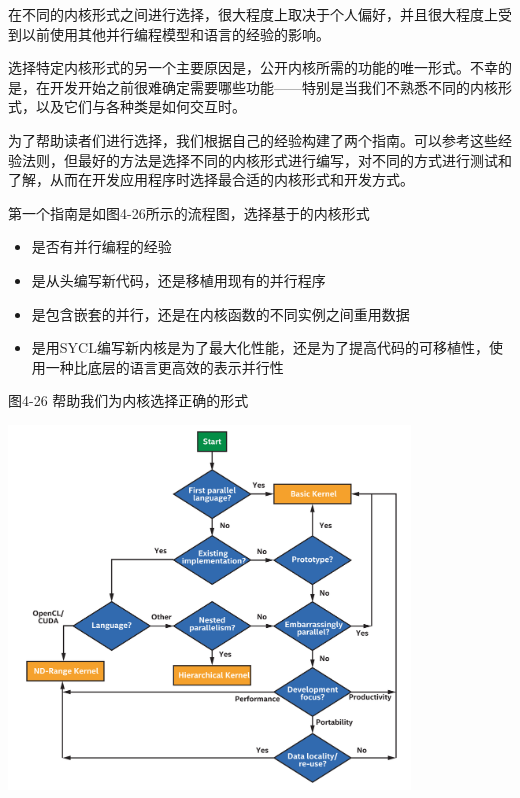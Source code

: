 在不同的内核形式之间进行选择，很大程度上取决于个人偏好，并且很大程度上受到以前使用其他并行编程模型和语言的经验的影响。\par

选择特定内核形式的另一个主要原因是，公开内核所需的功能的唯一形式。不幸的是，在开发开始之前很难确定需要哪些功能——特别是当我们不熟悉不同的内核形式，以及它们与各种类是如何交互时。\par

为了帮助读者们进行选择，我们根据自己的经验构建了两个指南。可以参考这些经验法则，但最好的方法是选择不同的内核形式进行编写，对不同的方式进行测试和了解，从而在开发应用程序时选择最合适的内核形式和开发方式。\par

第一个指南是如图4-26所示的流程图，选择基于的内核形式\par

\begin{itemize}
	\item 是否有并行编程的经验
	\item 是从头编写新代码，还是移植用现有的并行程序
	\item 是包含嵌套的并行，还是在内核函数的不同实例之间重用数据
	\item 是用SYCL编写新内核是为了最大化性能，还是为了提高代码的可移植性，使用一种比底层的语言更高效的表示并行性
\end{itemize}

\hspace*{\fill} \par %
图4-26 帮助我们为内核选择正确的形式
\begin{center}
	\includegraphics[width=0.8\textwidth]{content/chapter-4/images/7}
\end{center}

